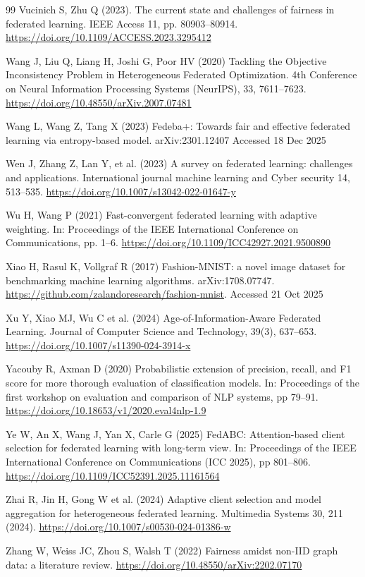 \documentclass[pdflatex,sn-mathphys-num,oneside]{sn-jnl}%
\theoremstyle{thmstyleone}%
\theoremstyle{thmstyletwo}%
\theoremstyle{thmstylethree}%
\begin{document}
\begin{thebibliography}{99}
Vucinich S, Zhu Q (2023). The current state and challenges of fairness in federated learning. IEEE Access 11, pp. 80903–80914. \url{https://doi.org/10.1109/ACCESS.2023.3295412}

Wang J, Liu Q, Liang H, Joshi G, Poor HV (2020) Tackling the Objective Inconsistency Problem in Heterogeneous Federated Optimization. 4th Conference on Neural Information Processing Systems (NeurIPS), 33, 7611–7623. \url{https://doi.org/10.48550/arXiv.2007.07481}

Wang L, Wang Z, Tang X (2023) Fedeba+: Towards fair and effective federated learning via entropy-based model. arXiv:2301.12407 Accessed 18 Dec 2025

Wen J, Zhang Z, Lan Y, et al. (2023) A survey on federated learning: challenges and applications. International journal machine learning and Cyber security 14, 513–535. \url{https://doi.org/10.1007/s13042-022-01647-y}

Wu H, Wang P (2021) Fast-convergent federated learning with adaptive weighting. In: Proceedings of the IEEE International Conference on Communications, pp. 1–6. \url{https://doi.org/10.1109/ICC42927.2021.9500890}

Xiao H, Rasul K, Vollgraf R (2017) Fashion-MNIST: a novel image dataset for benchmarking machine learning algorithms. arXiv:1708.07747. \url{https://github.com/zalandoresearch/fashion-mnist}. Accessed 21 Oct 2025

Xu Y, Xiao MJ, Wu C et al. (2024) Age-of-Information-Aware Federated Learning. Journal of Computer Science and Technology, 39(3), 637–653. \url{https://doi.org/10.1007/s11390-024-3914-x}

Yacouby R, Axman D (2020) Probabilistic extension of precision, recall, and F1 score for more thorough evaluation of classification models. In: Proceedings of the first workshop on evaluation and comparison of NLP systems, pp 79–91. \url{https://doi.org/10.18653/v1/2020.eval4nlp-1.9}

Ye W, An X, Wang J, Yan X, Carle G (2025) FedABC: Attention-based client selection for federated learning with long-term view. In: Proceedings of the IEEE International Conference on Communications (ICC 2025), pp 801–806. \url{https://doi.org/10.1109/ICC52391.2025.11161564}

Zhai R, Jin H, Gong W et al. (2024) Adaptive client selection and model aggregation for heterogeneous federated learning. Multimedia Systems 30, 211 (2024). \url{https://doi.org/10.1007/s00530-024-01386-w}

Zhang W, Weiss JC, Zhou S, Walsh T (2022) Fairness amidst non-IID graph data: a literature review. \url{https://doi.org/10.48550/arXiv:2202.07170}

\end{thebibliography}

    



\endgroup
\end{document}
